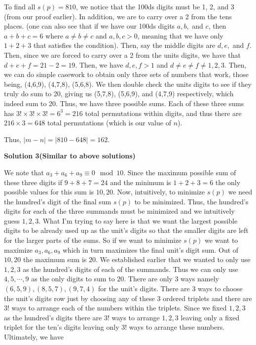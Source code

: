 \begin{enumerate}
 To find all \( s(p) = 810 \), we notice that the 100ds digits must be 1, 2, and 3 (from our proof earlier). In addition, we are to carry over a 2 from the tens places. (one can also see that if we have our 100ds digits \( a, b, \) and \( c \), then \( a+b+c = 6 \) where \( a \neq b \neq c \) and \( a,b,c > 0 \), meaning that we have only \( 1+2+3 \) that satisfies the condition). Then, say the middle digits are \( d, e, \) and \( f \). Then, since we are forced to carry over a 2 from the units digits, we have that \( d+e+f = 21-2 = 19 \). Then, we have \( d,e,f > 1 \) and \( d \neq e \neq f \neq 1,2,3 \). Then, we can do simple casework to obtain only three sets of numbers that work, those being, (4,6,9), (4,7,8), (5,6,8). We then double check the units digits to see if they truly do sum to 20, giving us (5,7,8), (5,6,9), and (4,7,9) respectively, which indeed sum to 20. Thus, we have three possible sums. Each of these three sums has \( 3! \times 3! \times 3! = 6^3 = 216 \) total permutations within digits, and thus there are \( 216 \times 3 = 648 \) total permutations (which is our value of \( n \)).

 Thus, \( |m-n| = |810 - 648| = \boxed{162} \).

 



\textbf{Solution 3(Similar to above solutions)}

We note that $a_3 + a_6 + a_9 \equiv 0\mod 10$. Since the maximum possible sum of these three digits if $9 + 8 + 7 = 24$ and the minimum is $1 + 2 + 3 = 6$ the only possible values for this sum is $10, 20$. Now, intuitively, to minimize $s(p)$ we need the hundred's digit of the final sum $s(p)$ to be minimized. Thus, the hundred's digits for each of the three summands must be minimized and we intuitively guess $1, 2, 3$. What I'm trying to say here is that we want the largest possible digits to be already used up as the unit's digits so that the smaller digits are left for the larger parts of the sums. So if we want to minimize $s(p)$ we want to maximize $a_3, a_6, a_9$ which in turn maximizes the final unit's digit sum. Out of $10, 20$ the maximum sum is $20$. We established earlier that we wanted to only use $1, 2, 3$ as the hundred's digits of each of the summands. Thus we can only use $4, 5, \cdots, 9$ as the only digits to sum to $20$. There are only $3$ ways namely $(6, 5, 9), (8, 5, 7), (9, 7, 4)$ for the unit's digits. There are $3$ ways to choose the unit's digits row just by choosing any of these $3$ ordered triplets and there are $3!$ ways to arrange each of the numbers within the triplets. Since we fixed $1, 2, 3$ as the hundred's digits there are $3!$ ways to arrange $1, 2, 3$ leaving only a fixed triplet for the ten's digits leaving only $3!$ ways to arrange these numbers. Ultimately, we have


\end{enumerate}
